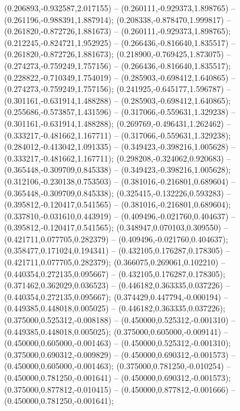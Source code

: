  (0.206893,-0.932587,2.017155) -- (0.260111,-0.929373,1.898765) -- (0.261196,-0.988391,1.887914);
 (0.208338,-0.878470,1.999817) -- (0.261820,-0.872726,1.881673) -- (0.260111,-0.929373,1.898765);
 (0.212245,-0.824721,1.952925) -- (0.266436,-0.816640,1.835517) -- (0.261820,-0.872726,1.881673);
 (0.218900,-0.769425,1.873075) -- (0.274273,-0.759249,1.757156) -- (0.266436,-0.816640,1.835517);
 (0.228822,-0.710349,1.754019) -- (0.285903,-0.698412,1.640865) -- (0.274273,-0.759249,1.757156);
 (0.241925,-0.645177,1.596787) -- (0.301161,-0.631914,1.488288) -- (0.285903,-0.698412,1.640865);
 (0.255686,-0.573857,1.431596) -- (0.317066,-0.559631,1.329238) -- (0.301161,-0.631914,1.488288);
 (0.269769,-0.496431,1.262462) -- (0.333217,-0.481662,1.167711) -- (0.317066,-0.559631,1.329238);
 (0.284012,-0.413042,1.091335) -- (0.349423,-0.398216,1.005628) -- (0.333217,-0.481662,1.167711);
 (0.298208,-0.324062,0.920683) -- (0.365448,-0.309709,0.845338) -- (0.349423,-0.398216,1.005628);
 (0.312106,-0.230138,0.753503) -- (0.381016,-0.216801,0.689604) -- (0.365448,-0.309709,0.845338);
 (0.325415,-0.132226,0.593283) -- (0.395812,-0.120417,0.541565) -- (0.381016,-0.216801,0.689604);
 (0.337810,-0.031610,0.443919) -- (0.409496,-0.021760,0.404637) -- (0.395812,-0.120417,0.541565);
 (0.348947,0.070103,0.309550) -- (0.421711,0.077705,0.282379) -- (0.409496,-0.021760,0.404637);
 (0.358477,0.171024,0.194341) -- (0.432105,0.176287,0.178305) -- (0.421711,0.077705,0.282379);
 (0.366075,0.269061,0.102210) -- (0.440354,0.272135,0.095667) -- (0.432105,0.176287,0.178305);
 (0.371462,0.362029,0.036523) -- (0.446182,0.363335,0.037226) -- (0.440354,0.272135,0.095667);
 (0.374429,0.447794,-0.000194) -- (0.449385,0.448018,0.005025) -- (0.446182,0.363335,0.037226);
 (0.375000,0.525312,-0.008188) -- (0.450000,0.525312,-0.001310) -- (0.449385,0.448018,0.005025);
 (0.375000,0.605000,-0.009141) -- (0.450000,0.605000,-0.001463) -- (0.450000,0.525312,-0.001310);
 (0.375000,0.690312,-0.009829) -- (0.450000,0.690312,-0.001573) -- (0.450000,0.605000,-0.001463);
 (0.375000,0.781250,-0.010254) -- (0.450000,0.781250,-0.001641) -- (0.450000,0.690312,-0.001573);
 (0.375000,0.877812,-0.010415) -- (0.450000,0.877812,-0.001666) -- (0.450000,0.781250,-0.001641);
